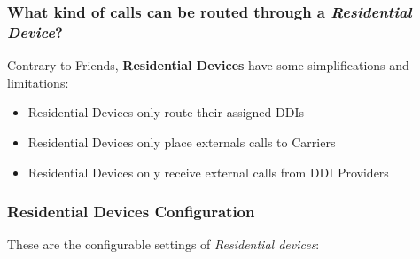 \documentclass[letterpaper,10pt,spanish]{sphinxmanual}
\begin{document}
\subsubsection{What kind of calls can be routed through a \emph{Residential Device}?}
\label{administration_portal/client/residential/residential_devices:what-kind-of-calls-can-be-routed-through-a-residential-device}
Contrary to Friends, \textbf{Residential Devices} have some simplifications and limitations:
\begin{itemize}
\item {} 
Residential Devices only route their assigned DDIs

\item {} 
Residential Devices only place externals calls to Carriers

\item {} 
Residential Devices only receive external calls from DDI Providers

\end{itemize}


\subsubsection{Residential Devices Configuration}
\label{administration_portal/client/residential/residential_devices:residential-devices-configuration}
These are the configurable settings of \emph{Residential devices}:
\end{document}
